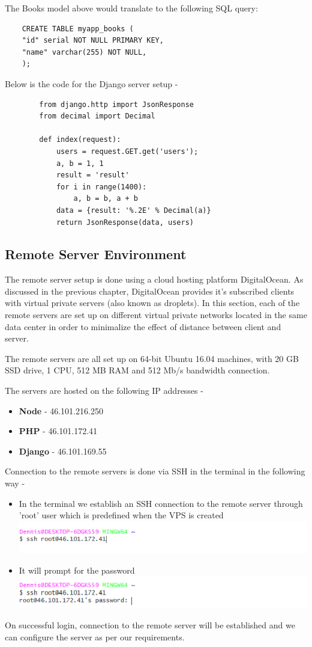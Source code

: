 \documentclass[../thesis.tex]{subfiles}
\begin{document}
	The Books model above would translate to the following SQL query:
	\begin{verbatim}
	CREATE TABLE myapp_books (
	"id" serial NOT NULL PRIMARY KEY,
	"name" varchar(255) NOT NULL,
	);
	\end{verbatim}
	Below is the code for the Django server setup - 
	\begin{Verbatim}
		from django.http import JsonResponse
		from decimal import Decimal
		
		def index(request):
			users = request.GET.get('users');
			a, b = 1, 1
			result = 'result'
			for i in range(1400):
				a, b = b, a + b
			data = {result: '%.2E' % Decimal(a)}
			return JsonResponse(data, users)		
	\end{Verbatim}
	\subsection{Remote Server Environment}
	The remote server setup is done using a cloud hosting platform DigitalOcean. As discussed in the previous chapter, DigitalOcean provides it's subscribed clients with virtual private servers (also known as droplets). In this section, each of the remote servers are set up on different virtual private networks located in the same data center in order to minimalize the effect of distance between client and server.
	\newline
	
	The remote servers are all set up on 64-bit Ubuntu 16.04 machines, with 20 GB SSD drive, 1 CPU, 512 MB RAM and 512 Mb/s bandwidth connection.
	\newline
	
	The servers are hosted on the following IP addresses - 	

	\begin{itemize}
		\item \textbf{Node} - 46.101.216.250
		\smallskip
		\item \textbf{PHP} - 46.101.172.41
		\smallskip
		\item \textbf{Django} - 46.101.169.55
	\end{itemize}
	Connection to the remote servers is done via SSH in the terminal in the following way -
	\begin{itemize}
		\item In the terminal we establish an SSH connection to the remote server through 'root' user which is predefined when the VPS is created
		\includegraphics[width=1\textwidth]{../images/ssh1.png}
		\item It will prompt for the password
		\newline
		\includegraphics[width=1\textwidth]{../images/ssh2.png}
	\end{itemize}
	On successful login, connection to the remote server will be established and we can configure the server as per our requirements.
\end{document}
